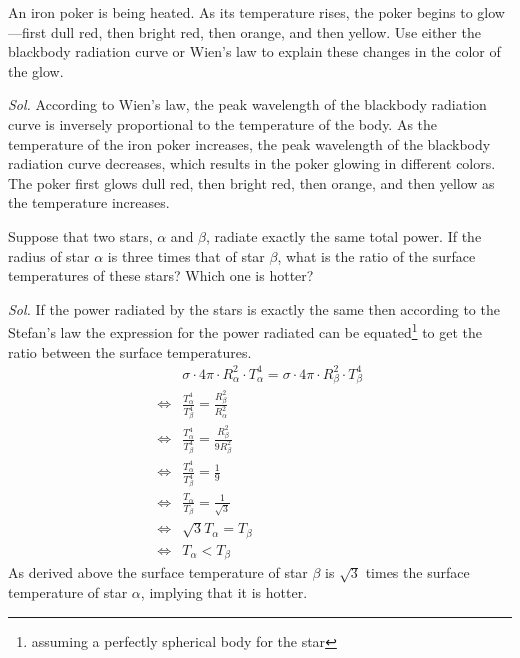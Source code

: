 \documentclass{article}
\theoremstyle{mytheoremstyle}
\theoremstyle{mytheoremstyle}
\theoremstyle{myproblemstyle}
\begin{document}
\begin{problem}
An iron poker is being heated. As its temperature rises, the poker begins to glow—first dull red, then bright red, then orange, and then yellow. Use either the blackbody radiation curve or Wien's law to explain these changes in the color of the glow.
\end{problem}
\textit{ Sol. } According to Wien's law, the peak wavelength of the blackbody radiation curve is inversely proportional to the temperature of the body. As the temperature of the iron poker increases, the peak wavelength of the blackbody radiation curve decreases, which results in the poker glowing in different colors. The poker first glows dull red, then bright red, then orange, and then yellow as the temperature increases.

\begin{problem}
Suppose that two stars, \(\alpha\) and \(\beta\), radiate exactly the same total power. If the radius of star \(\alpha\) is three times that of star \(\beta\), what is the ratio of the surface temperatures of these stars? Which one is hotter?
\end{problem}
\textit{ Sol. } If the power radiated by the stars is exactly the same then according to the Stefan's law the expression for the power radiated can be equated\footnote{assuming a perfectly spherical body for the star} to get the ratio between the surface temperatures.
\begin{align*}
	     & \sigma \cdot 4\pi \cdot R_{\alpha}^2 \cdot T_{\alpha}^4  = \sigma \cdot 4\pi \cdot R_{\beta}^2 \cdot T_{\beta}^4 \\
	\iff & \frac{T_{\alpha}^4}{T_{\beta}^4}                    = \frac{R_{\beta}^2}{R_{\alpha}^2}                           \\
	\iff & \frac{T_{\alpha}^4}{T_{\beta}^4}                    = \frac{R_{\beta}^2}{9R_{\beta}^2}                           \\
	\iff & \frac{T_{\alpha}^4}{T_{\beta}^4}                    = \frac{1}{9}                                                \\
	\iff & \frac{T_{\alpha}}{T_{\beta}}                        = \frac{1}{\sqrt{3}}                                         \\
	\iff & \sqrt{3}T_{\alpha}                                  = T_{\beta}                                                  \\
	\iff & T_{\alpha}                                          < T_{\beta}
\end{align*}
As derived above the surface temperature of star \(\beta\) is \(\sqrt{3}\) times the surface temperature of star \(\alpha\), implying that it is hotter.
\end{document}
